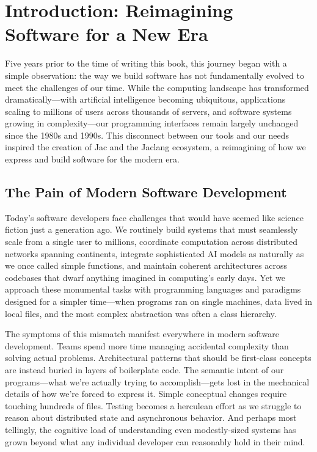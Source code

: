 \chapter{Introduction: Reimagining Software for a New Era}

Five years prior to the time of writing this book, this journey began with a simple observation: the way we build software has not fundamentally evolved to meet the challenges of our time. While the computing landscape has transformed dramatically—with artificial intelligence becoming ubiquitous, applications scaling to millions of users across thousands of servers, and software systems growing in complexity—our programming interfaces remain largely unchanged since the 1980s and 1990s. This disconnect between our tools and our needs inspired the creation of Jac and the Jaclang ecosystem, a reimagining of how we express and build software for the modern era.

\section{The Pain of Modern Software Development}

Today's software developers face challenges that would have seemed like science fiction just a generation ago. We routinely build systems that must seamlessly scale from a single user to millions, coordinate computation across distributed networks spanning continents, integrate sophisticated AI models as naturally as we once called simple functions, and maintain coherent architectures across codebases that dwarf anything imagined in computing's early days. Yet we approach these monumental tasks with programming languages and paradigms designed for a simpler time—when programs ran on single machines, data lived in local files, and the most complex abstraction was often a class hierarchy.

The symptoms of this mismatch manifest everywhere in modern software development. Teams spend more time managing accidental complexity than solving actual problems. Architectural patterns that should be first-class concepts are instead buried in layers of boilerplate code. The semantic intent of our programs—what we're actually trying to accomplish—gets lost in the mechanical details of how we're forced to express it. Simple conceptual changes require touching hundreds of files. Testing becomes a herculean effort as we struggle to reason about distributed state and asynchronous behavior. And perhaps most tellingly, the cognitive load of understanding even modestly-sized systems has grown beyond what any individual developer can reasonably hold in their mind.

